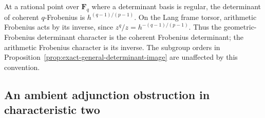 \begin{remark}\label{rem:det-frobenius-convention}
At a rational point over $\mathbf F_q$ where a determinant
basis is regular, the determinant of coherent $q$-Frobenius
is $h^{(q-1)/(p-1)}$.  On the Lang frame torsor,
arithmetic Frobenius acts by its inverse, since
$z^q/z=h^{-(q-1)/(p-1)}$.
Thus the geometric-Frobenius determinant character is
the coherent Frobenius determinant; the arithmetic
Frobenius character is its inverse.  The subgroup orders
in Proposition~\ref{prop:exact-general-determinant-image}
are unaffected by this convention.
\end{remark}


\subsection{An ambient adjunction obstruction in characteristic two}
\label{subsec:general-adjunction-covector}

